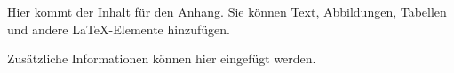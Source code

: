 
Hier kommt der Inhalt für den Anhang. Sie können Text, Abbildungen, Tabellen 
und andere LaTeX-Elemente hinzufügen.

Zusätzliche Informationen können hier eingefügt werden. 